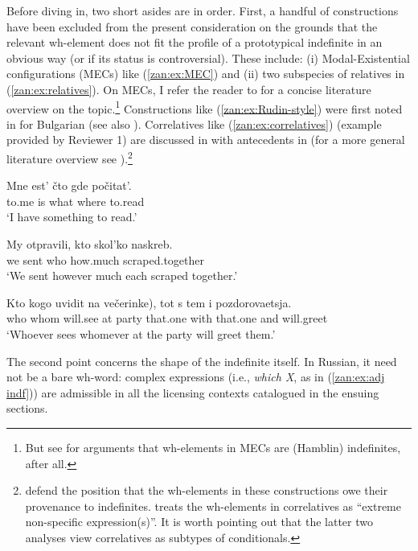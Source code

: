 \documentclass[output=paper,colorlinks,citecolor=brown]{langscibook}
\begin{document}
Before diving in, two short asides are in order. First, a handful of constructions have been excluded from the present consideration on the grounds that the relevant wh-element does not fit the profile of a prototypical indefinite in an obvious way (or if its status is controversial). These include: (i) Modal-Existential configurations (MECs) like (\ref{zan:ex:MEC}) and (ii) two subspecies of relatives in (\ref{zan:ex:relatives}). On MECs, I refer the reader to \citet{vsimik2017existential} for a concise literature overview on the topic.\footnote{But see \citet{vsimik2009hamblin} for arguments that wh-elements in MECs are (Hamblin) indefinites, after all.} Constructions like (\ref{zan:ex:Rudin-style}) were first noted in \citet{rudin2007multiple} for Bulgarian (see also \citealt{caponigro2022semantics}). Correlatives like (\ref{zan:ex:correlatives}) (example provided by Reviewer 1) are discussed in  \citet{Citko2009} with antecedents in \citet{izvorski1996syntax} (for a more general literature overview see \citealt{lin2020correlatives}).\footnote{\citet{belyaev2020genesis} defend the position that the wh-elements in these constructions owe their provenance to indefinites. \citet{arsenijevic2009relative} treats the wh-elements in correlatives as ``extreme non-specific expression(s)''. It is worth pointing out that the latter two analyses view correlatives as subtypes of conditionals.}       

 \ea\label{zan:ex:MEC}
        \gll Mne est' čto gde počitat'.\\
        to.me is what where to.read \\
        \glt `I have something to read.' 
 \z       
 
\ea \label{zan:ex:relatives}
\ea \label{zan:ex:Rudin-style}\gll My otpravili, kto skol'ko naskreb. \\
we sent who how.much scraped.together\\
\glt `We sent however much each scraped together.'

\ex \label{zan:ex:correlatives} \gll Kto kogo uvidit \minsp{(} na večerinke), tot s tem i pozdorovaetsja.\\
who whom will.see {} at party that.one with that.one and will.greet\\
\glt `Whoever sees whomever at the party will greet them.'

\z\z

\noindent The second point concerns the shape of the indefinite itself. In Russian, it need not be a bare wh-word: complex expressions (i.e., \textit{which X}, as in (\ref{zan:ex:adj indf})) are admissible in all the licensing contexts catalogued in the ensuing sections.        
\end{document}

